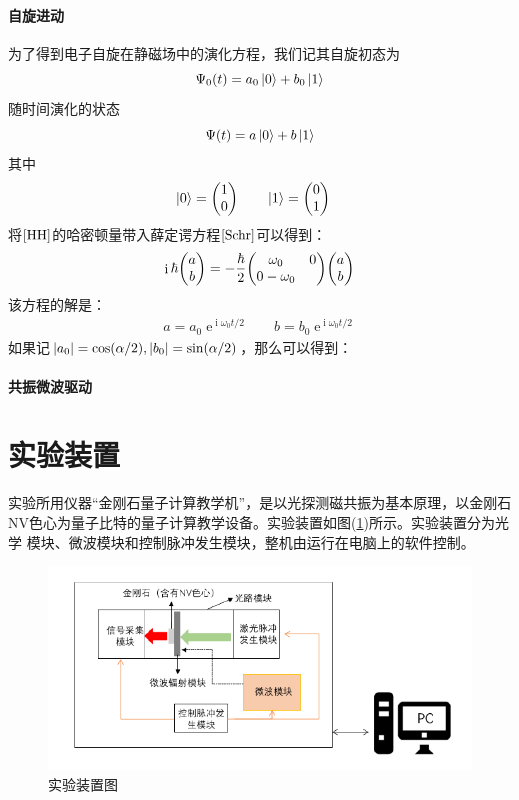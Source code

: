 \documentclass[a4paper]{article}
\DeclareMathOperator{\e}{\mathrm{e}}
\DeclareMathOperator{\I}{\mathrm{i}}
\begin{document}
\paragraph{自旋进动}
为了得到电子自旋在静磁场中的演化方程，我们记其自旋初态为
\begin{equation}\label{key}
\Psi_0(t) = a_0\ket{0} + b_0\ket{1}
\end{equation}
随时间演化的状态
\begin{equation}\label{key}
\Psi(t) = a\ket{0} + b\ket{1}
\end{equation}
其中
\begin{align}\label{key}
\ket{0} = \mqty(1\\ 0) & \qquad \ket{1} = \mqty(0\\ 1)
\end{align}
将$ \eqref{HH} $的哈密顿量带入薛定谔方程$ \eqref{Schr} $可以得到：
\begin{equation}\label{key}
\I\hbar\mqty(a\\ b) = -\dfrac{\hbar}{2}\mqty(\omega_0 & 0\\ 0 -\omega_0) \mqty(a\\ b)
\end{equation}
该方程的解是：
\begin{align}\label{key}
a = a_0\e^{\I \omega_0 t/2} &\quad  b = b_0\e^{\I \omega_0 t/2}
\end{align}
如果记$ \abs{a_0} = \cos(\alpha/2), \abs{b_0} = \sin(\alpha/2) $，那么可以得到：

\paragraph{共振微波驱动}

\section{实验装置}
实验所用仪器“金刚石量子计算教学机”，是以光探测磁共振为基本原理，以金刚石
NV色心为量子比特的量子计算教学设备。实验装置如图(\ref{fig:equip})所示。实验装置分为光学
模块、微波模块和控制脉冲发生模块，整机由运行在电脑上的软件控制。
\begin{figure}[H]
	\centering
	\includegraphics[width=0.9\linewidth]{fig/equip.jpg}
	\caption{实验装置图}
	\label{fig:equip}
\end{figure}
\end{document}
